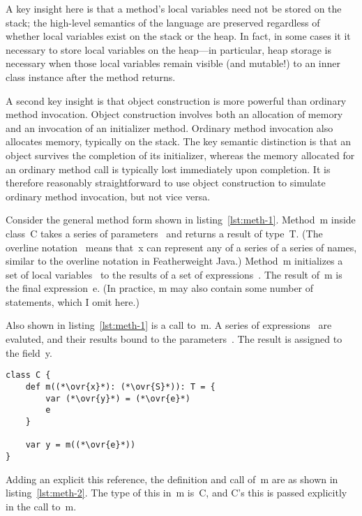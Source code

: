 A key insight here is that a method's local variables need not be stored on the stack; the high-level semantics of the language are preserved regardless of whether local variables exist on the stack or the heap. In fact, in some cases it it necessary to store local variables on the heap---in particular, heap storage is necessary when those local variables remain visible (and mutable!) to an inner class instance after the method returns.

A second key insight is that object construction is more powerful than ordinary method invocation. Object construction involves both an allocation of memory and an invocation of an initializer method. Ordinary method invocation also allocates memory, typically on the stack. The key semantic distinction is that an object survives the completion of its initializer, whereas the memory allocated for an ordinary method call is typically lost immediately upon completion. It is therefore reasonably straightforward to use object construction to simulate ordinary method invocation, but not vice versa.

Consider the general method form shown in listing~\ref{lst:meth-1}. Method~{\cd m} inside class~{\cd C} takes a series of parameters~{\cd {}} and returns a result of type~{\cd T}. (The overline notation~{\cd {}} means that~{\cd x} can represent any of a series of a series of names, similar to the overline notation in Featherweight Java.) Method~{\cd m} initializes a set of local variables~{\cd {}} to the results of a set of expressions~{\cd {}}. The result of~{\cd m} is the final expression~{\cd e}. (In practice, {\cd m} may also contain some number of statements, which I omit here.)

Also shown in listing~\ref{lst:meth-1} is a call to~{\cd m}. A series of expressions~{\cd {}} are evaluted, and their results bound to the parameters~{\cd {}}. The result is assigned to the field~{\cd y}.

\begin{lstlisting}[float=htbp, caption={Method Transformation 1}, label={lst:meth-1}]
class C {
	def m((*\ovr{x}*): (*\ovr{S}*)): T = {
		var (*\ovr{y}*) = (*\ovr{e}*)
		e
	}

	var y = m((*\ovr{e}*))
}
\end{lstlisting}

Adding an explicit {\cd this} reference, the definition and call of~{\cd m} are as shown in listing~\ref{lst:meth-2}. The type of {\cd this} in~{\cd m} is~{\cd C}, and \mbox{{\cd C}'s} {\cd this} is passed explicitly in the call to~{\cd m}.


